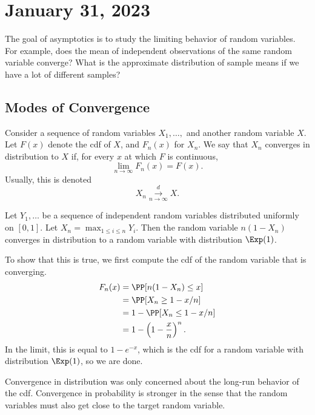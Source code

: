 \section{January 31, 2023}

The goal of asymptotics is to study the limiting behavior of random variables. For example, does the mean of independent observations of the same random variable converge? What is the approximate distribution of sample means if we have a lot of different samples?

\subsection{Modes of Convergence}

\begin{definition}

Consider a sequence of random variables $X_1, \hdots, $ and another random variable $X$. Let $F(x)$ denote the cdf of $X$, and $F_n(x)$ for $X_n$. We say that $X_n$ converges in distribution to $X$ if, for every $x$ at which $F$ is continuous, 
\[\lim_{n\rightarrow \infty}F_n(x) = F(x).\]
Usually, this is denoted 
\[X_n \overset{d}{\underset{n\rightarrow{\infty}}{\longrightarrow}}X.\]
\end{definition}

\begin{example}
\exlabel

Let $Y_1, \hdots$ be a sequence of independent random variables distributed uniformly on $[0,1]$. Let $X_n = \max_{1\leq i\leq n}Y_i$. Then the random variable $n(1-X_n)$ converges in distribution to a random variable with distribution $\Exp(1)$. 
\end{example}

To show that this is true, we first compute the cdf of the random variable that is converging. 
\begin{align*}
    F_n(x) &= \PP[n(1-X_n) \leq x] \\
    &= \PP[X_n\geq 1-x/n] \\
    &= 1 - \PP[X_n\leq 1-x/n] \\
    &= 1 - \left(1-\frac{x}{n}\right)^n.
\end{align*}
In the limit, this is equal to $1-e^{-x}$, which is the cdf for a random variable with distribution $\Exp(1)$, so we are done. 

Convergence in distribution was only concerned about the long-run behavior of the cdf. Convergence in probability is stronger in the sense that the random variables must also get close to the target random variable. 

